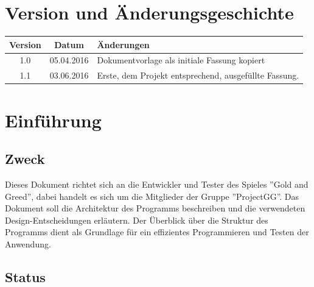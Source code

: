 \documentclass[fontsize=12pt,paper=a4,twoside]{scrartcl}
\begin{document}


\newpage

  \thispagestyle{fancy}
  \fancyhead{}
  \fancyfoot{}
  \renewcommand{\headrulewidth}{0.4pt}
  \tableofcontents

\newpage



\section*{Version und Änderungsgeschichte}

\begin{tabular}{ccl}
Version & Datum & Änderungen \\
\hline
1.0 & 05.04.2016 & Dokumentvorlage als initiale Fassung kopiert \\
1.1 & 03.06.2016 & Erste, dem Projekt entsprechend, ausgefüllte Fassung. \\
\end{tabular}


\section{Einführung}

\subsection{Zweck}

Dieses Dokument richtet sich an die Entwickler und Tester des Spieles ''Gold and Greed'', dabei handelt es sich um die Mitglieder der Gruppe ''ProjectGG''. Das Dokument soll die Architektur des Programms beschreiben und die verwendeten Design-Entscheidungen erläutern. Der Überblick über die Struktur des Programms dient als Grundlage für ein effizientes Programmieren und Testen der Anwendung.

\subsection{Status}
\end{document}
